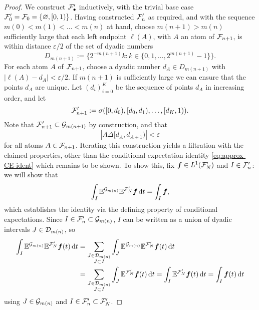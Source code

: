 \begin{proof}
  We construct $\mathcal{F}'_{\bullet}$ inductively, with the trivial base case $\mathcal{F}'_{0} = \mathcal{F}_{0} = \{\varnothing, [0,1)\}$.
  Having constructed $\mathcal{F}'_{n}$ as required, and with the sequence $m(0) < m(1) < \ldots < m(n)$ at hand, choose $m(n+1) > m(n)$ sufficiently large that each left endpoint $\ell(A)$, with $A$ an atom of $\mathcal{F}_{n+1}$, is within distance $\varepsilon/2$ of the set of dyadic numbers
  \begin{equation*}
    D_{m(n+1)} := \{2^{-m(n+1)}k : k \in \{0,1,\ldots,2^{m(n+1)} - 1\}\}.
  \end{equation*}
  For each atom $A$ of $\mathcal{F}_{n+1}$, choose a dyadic number $d_{A} \in D_{m(n+1)}$ with $|\ell(A) - d_{A}| < \varepsilon/2$.
  If $m(n+1)$ is sufficiently large we can ensure that the points $d_{A}$ are unique.
  Let $(d_{i})_{i=0}^{K}$ be the sequence of points $d_{A}$ in increasing order, and let
  \begin{equation*}
    \mathcal{F}'_{n+1} := \sigma([0,d_{0}), [d_{0}, d_{1}), \ldots, [d_{K},1)).
  \end{equation*}
  Note that $\mathcal{F}'_{n+1} \subset \mathcal{G}_{m(n+1)}$ by construction, and that
  \begin{equation*}
    |A \Delta [d_{A}, d_{A+1})| < \varepsilon
  \end{equation*}
  for all atoms $A \in \mathcal{F}_{n+1}$.
  Iterating this construction yields a filtration with the claimed properties, other than the conditional expectation identity \eqref{eq:approx-CE-ident} which remains to be shown.
  To show this, fix $\bm{f} \in L^1(\mathcal{F}_{N}')$ and $I \in \mathcal{F}_{n}'$: we will show that
  \begin{equation*}
    \int_{I} \mathbb{E}^{\mathcal{G}_{m(n)}} \mathbb{E}^{\mathcal{F}_{N}'} \bm{f} \, \mathrm{d} t = \int_{I} \bm{f},
  \end{equation*}
  which establishes the identity via the defining property of conditional expectations.
  Since $I \in \mathcal{F}_{n}' \subset \mathcal{G}_{m(n)}$, $I$ can be written as a union of dyadic intervals $J \in \mathcal{D}_{m(n)}$, so
  \begin{equation*}
    \begin{aligned}
      \int_{I} \mathbb{E}^{\mathcal{G}_{m(n)}} \mathbb{E}^{\mathcal{F}_{N}'} \bm{f}(t) \, \mathrm{d} t
      &= \sum_{\substack{J \in \mathcal{D}_{m(n)} \\ J \subset I}} \int_{J} \mathbb{E}^{\mathcal{G}_{m(n)}} \mathbb{E}^{\mathcal{F}_{N}'} \bm{f}(t) \, \mathrm{d} t \\
      &= \sum_{\substack{J \in \mathcal{D}_{m(n)} \\ J \subset I}} \int_{J} \mathbb{E}^{\mathcal{F}_{N}'} \bm{f}(t) \, \mathrm{d} t
      = \int_{I} \mathbb{E}^{\mathcal{F}_{N}'} \bm{f}(t) \, \mathrm{d} t = \int_{I} \bm{f}(t) \, \mathrm{d} t
    \end{aligned}
  \end{equation*}
  using $J \in \mathcal{G}_{m(n)}$ and $I \in \mathcal{F}_{n}' \subset \mathcal{F}_{N}'$.
\end{proof}

